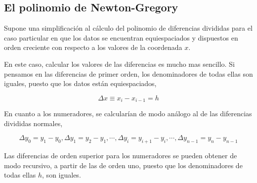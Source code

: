 \begin{paracol}{2} 
 \subsection{El polinomio de Newton-Gregory} \label{sec:newgre}  
 Supone una simplificación al cálculo del polinomio de diferencias divididas para el caso particular en que los datos se encuentran equiespaciados y dispuestos en orden creciente con respecto a los valores de la coordenada $x$.
 
En este caso, calcular los valores de las diferencias es mucho mas sencillo.  Si pensamos en las diferencias de primer orden, los denominadores de todas ellas son iguales, puesto que los datos están equiespaciados,
\end{paracol}
\begin{equation*}
\Delta x \equiv x_i-x_{i-1} =h
\end{equation*}
\begin{paracol}{2}
En cuanto a los numeradores, se calcularían de modo análogo al de las diferencias divididas normales,
\end{paracol}
\begin{equation*}
\Delta y_0= y_1-y_0, \Delta y_1=y_2-y_1, \cdots, \Delta y_i=y_{i+1}-y_i, \cdots, \Delta y_{n-1}=y_{n}-y_{n-1}
\end{equation*}
\begin{paracol}{2}
Las diferencias de orden superior para los numeradores se pueden obtener de modo recursivo, a partir de las de orden uno, puesto que los denominadores de todas ellas $h$, son iguales.
\end{paracol}

